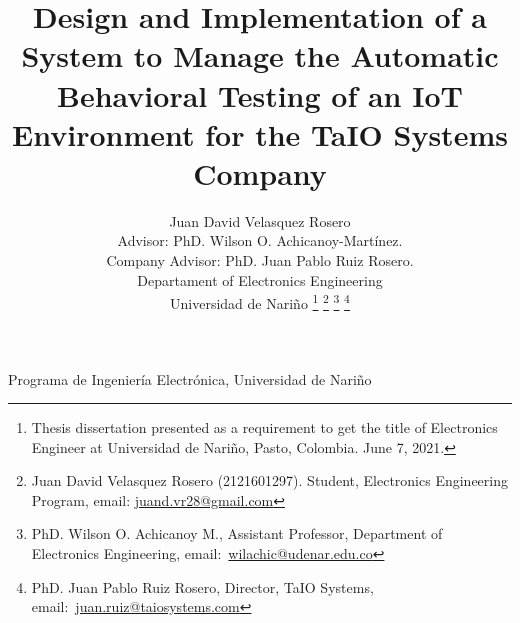 \documentclass[journal]{IEEEtran}	%
\begin{document}
\title{Design and Implementation of a System to Manage the Automatic Behavioral Testing of an IoT Environment for the TaIO Systems Company}

\author{Juan David Velasquez Rosero \\Advisor: PhD. Wilson O. Achicanoy-Martínez.\\Company Advisor: PhD. Juan Pablo Ruiz Rosero.\\Departament of Electronics Engineering\\
Universidad de Nariño %
\thanks{Thesis dissertation presented as a requirement to get the title of Electronics Engineer at Universidad de Nariño, Pasto, Colombia. June 7, 2021.}
\thanks{Juan David Velasquez Rosero (2121601297). Student, Electronics Engineering Program, email: \href{juand.vr28@gmail.com}{juand.vr28@gmail.com}}
\thanks{PhD. Wilson O. Achicanoy M., Assistant Professor, Department of Electronics Engineering, email:~\href{wilachic@udenar.edu.co}{wilachic@udenar.edu.co}}
\thanks{PhD. Juan Pablo Ruiz Rosero, Director, TaIO Systems, email:~\href{juan.ruiz@taiosystems.com}{juan.ruiz@taiosystems.com}}}




%
{Programa de Ingeniería Electrónica, Universidad de Nariño}


\maketitle
\end{document}
